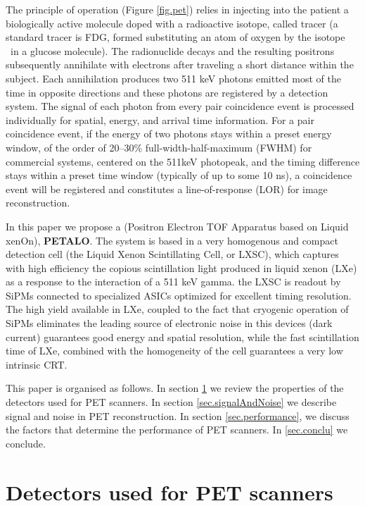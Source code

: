 \documentclass[review]{elsarticle}
\begin{document}
The principle of operation (Figure \ref{fig.pet}) relies in injecting into the patient a  
biologically active molecule doped with a radioactive isotope, called tracer (a standard tracer is FDG, formed substituting an atom of oxygen by the isotope \FDG\ in a glucose molecule). The radionuclide decays and the resulting positrons
subsequently annihilate with electrons after traveling a short distance within the subject.
Each annihilation produces two 511 keV photons emitted most of the time in opposite
directions and these photons are registered by a detection system. The signal of each photon
from every pair coincidence event is processed individually for spatial, energy, and arrival
time information. For a pair coincidence event, if the energy of two photons stays within a
preset energy window, of the order of 20--30\% full-width-half-maximum (FWHM) for commercial systems, centered on the 511keV photopeak, and the timing difference stays within a preset time window (typically of up to some 10 ns), a
coincidence event will be registered and constitutes a line-of-response (LOR) for image
reconstruction.

In this paper we propose a (Positron Electron TOF Apparatus based on Liquid xenOn), {\bf PETALO}. The system is based in a very homogenous and compact detection cell (the Liquid Xenon Scintillating Cell, or LXSC), which captures with high efficiency the copious scintillation light produced in liquid xenon (LXe) as a response to the interaction of a 511 keV gamma.  the LXSC is readout by SiPMs connected to specialized ASICs optimized for excellent timing resolution. The high yield available in LXe, coupled to the fact that cryogenic operation of SiPMs eliminates the leading source of electronic noise in this devices (dark current) guarantees good energy and spatial resolution, while the fast scintillation time of LXe, combined with the homogeneity of the cell guarantees a very low intrinsic CRT.

This paper is organised as follows. In section \ref{sec.det} we review the properties of the detectors used for PET scanners. In section \ref{sec.signalAndNoise} we describe signal and noise in PET reconstruction. In section \ref{sec.performance}, we discuss the factors that
determine the performance of PET scanners. 
In \ref{sec.conclu} we conclude. 

\section{Detectors used for PET scanners}
\label{sec.det}
\end{document}
